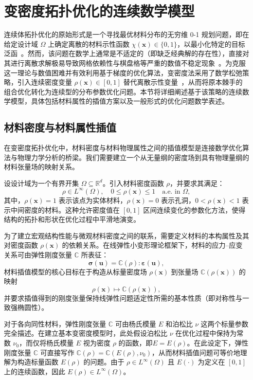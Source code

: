 \section{变密度拓扑优化的连续数学模型}
\label{sec:cont_models}

连续体拓扑优化的原始形式是一个寻找最优材料分布的无穷维 0-1 规划问题，即在给定设计域 $\Omega$ 上确定离散的材料示性函数 $\chi(\boldsymbol{x}) \in \{0, 1\}$，以最小化特定的目标泛函~\cite{bendsoeTopologyOptimization2004a}。然而，该问题在数学上通常是不适定的（即缺乏经典解的存在性），直接对其进行离散求解极易导致网格依赖性与棋盘格等严重的数值不稳定现象~\cite{kohnOptimalDesignRelaxation1986}。为克服这一理论与数值困难并有效利用基于梯度的优化算法，变密度法采用了数学松弛策略，引入连续密度变量 $\rho(\boldsymbol{x}) \in [0, 1]$ 替代离散示性变量~\cite{bendsoeOptimalShapeDesign1989a}，从而将原本棘手的组合优化转化为连续型的分布参数优化问题。本节将详细阐述基于该策略的连续数学模型，具体包括材料属性的插值方案以及一般形式的优化问题数学表述。


\subsection{材料密度与材料属性插值}
\label{subsec:material_interpolation}
在变密度拓扑优化中，材料密度与材料物理属性之间的插值模型是连接数学优化算法与物理力学分析的桥梁。我们需要建立一个从无量纲的密度场到具有物理量纲的材料张量场的映射关系。

设设计域为一个有界开集 $\Omega\subseteq\mathbb{R}^d$。引入材料密度函数 $\rho$，并要求其满足：
\[
\rho\in{L}^\infty(\Omega),\quad0\leq\rho(\boldsymbol{x})\leq1\quad \text{a.e. in } \Omega,
\]
其中，$\rho(\boldsymbol{x})=1$ 表示该点为实体材料，$\rho(\boldsymbol{x})=0$ 表示孔洞，$0<\rho(\boldsymbol{x})<1$ 表示中间密度的材料。这种允许密度值在 $[0,1]$ 区间连续变化的参数化方法，使得结构的拓扑和形状在优化过程中平滑地演变。

为了建立宏观结构性能与微观材料密度之间的联系，需要定义材料的本构属性及其对密度函数 $\rho(\boldsymbol{x})$ 的依赖关系。在线弹性小变形理论框架下，材料的应力–应变关系可由弹性刚度张量 $\mathbb{C}$ 所表征：
\[
\boldsymbol{\sigma}(\boldsymbol{u}) = \mathbb{C}(\rho):\boldsymbol{\varepsilon}(\boldsymbol{u}),
\]
材料插值模型的核心目标在于构造从标量密度场 $\rho(\boldsymbol{x})$ 到张量场 $\mathbb{C}(\rho(\boldsymbol{x}))$ 的映射
\[
\rho(\boldsymbol{x})\mapsto \mathbb{C}(\rho(\boldsymbol{x})),
\]
并要求插值得到的刚度张量保持线弹性问题适定性所需的基本性质（即对称性与一致强椭圆性）。

对于各向同性材料，弹性刚度张量 $\mathbb{C}$ 可由杨氏模量 $E$ 和泊松比 $\nu$ 这两个标量参数完全描述。在建立基本变密度模型时，此处假设泊松比 $\nu$ 在优化过程中保持为常数 $\nu_0$，而仅将杨氏模量 $E$ 视为密度 $\rho$ 的函数，即$E=E(\rho)$。在此设定下，弹性刚度张量 $\mathbb{C}$ 可直接写作 $\mathbb{C}(\rho) = \mathbb{C}(E(\rho),\nu_0)$，从而材料插值问题可等价地理解为构造标量函数 $E(\rho)$ 的问题。由于 $\rho\in L^\infty(\Omega)$ 且 $E(\cdot)$ 为定义在 $[0,1]$ 上的连续函数，因此 $E(\rho)\in L^\infty(\Omega)$。

